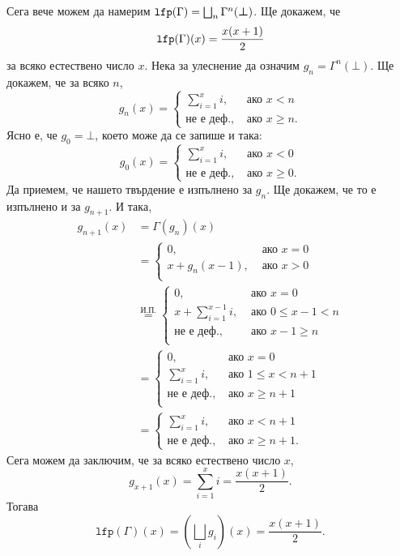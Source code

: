 \begin{example}
  Сега вече можем да намерим $\texttt{lfp}(\Gamma) = \bigsqcup_n \Gamma^n(\bm{\bot})$.
  Ще докажем, че
  \[\texttt{lfp}(\Gamma)(x) = \frac{x(x+1)}{2}\] за всяко естествено число $x$.
  Нека за улеснение да означим $g_n = \Gamma^n(\bm{\bot})$.
  Ще докажем, че за всяко $n$,
  \[g_n(x) = \begin{cases}
      \sum^x_{i=1}i, & \text{ ако } x < n\\
      \text{не е деф.}, & \text{ ако } x \geq n.
    \end{cases}\]
  Ясно е, че $g_0 = \bm{\bot}$, което може да се запише и така:
  \[g_0(x) = \begin{cases}
      \sum^x_{i=1}i, & \text{ ако } x < 0\\
      \text{не е деф.}, & \text{ ако } x \geq 0.
    \end{cases}\]
  Да приемем, че нашето твърдение е изпълнено за $g_n$.
  Ще докажем, че то е изпълнено и за $g_{n+1}$. И така,
  \begin{align*}
    g_{n+1}(x) & = \Gamma(g_n)(x)\\
               &  = \begin{cases}
                 0, & \text{ ако } x = 0\\
                 x + g_n(x-1), & \text{ ако }x > 0\\
               \end{cases}\\
               & \stackrel{\text{И.П.}}{=} \begin{cases}
                 0, & \text{ ако } x = 0\\
                 x + \sum^{x-1}_{i=1}i , & \text{ ако } 0 \leq x-1 < n\\
                 \text{не е деф.}, & \text{ ако }x-1 \geq n\\
               \end{cases}\\
               & = \begin{cases}
                 0, & \text{ ако } x = 0\\
                 \sum^{x}_{i=1}i , & \text{ ако } 1 \leq x < n+1\\
                 \text{не е деф.}, & \text{ ако }x \geq n+1\\
               \end{cases}\\
               & = \begin{cases}
                 \sum^{x}_{i=1}i , & \text{ ако } x < n+1\\
                 \text{не е деф.}, & \text{ ако }x \geq n+1.
               \end{cases}
  \end{align*}
  Сега можем да заключим, че за всяко естествено число $x$,
  \[g_{x+1}(x) = \sum^x_{i=1}i = \frac{x(x+1)}{2}.\]
  Тогава
  \[\texttt{lfp}(\Gamma)(x) = (\bigsqcup_i g_i)(x) = \frac{x(x+1)}{2}.\]
\end{example}

